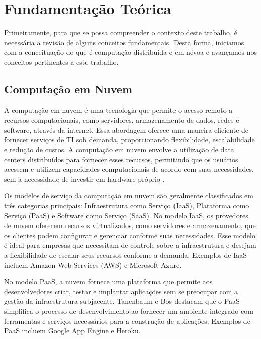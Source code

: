 \chapter{Fundamentação Teórica}

Primeiramente, para que se possa compreender o contexto deste trabalho, é necessária a revisão de alguns conceitos fundamentais. Desta forma, iniciamos com a conceituação do que é computação distribuída e em névoa e avançamos nos conceitos pertinentes a este trabalho.

\section{Computação em Nuvem}

A computação em nuvem é uma tecnologia que permite o acesso remoto a recursos computacionais, como servidores, armazenamento de dados, redes e software, através da internet. Essa abordagem oferece uma maneira eficiente de fornecer serviços de TI sob demanda, proporcionando flexibilidade, escalabilidade e redução de custos. A computação em nuvem envolve a utilização de data centers distribuídos para fornecer esses recursos, permitindo que os usuários acessem e utilizem capacidades computacionais de acordo com suas necessidades, sem a necessidade de investir em hardware próprio \cite{tanenbaum2015}.

Os modelos de serviço da computação em nuvem são geralmente classificados em três categorias principais: Infraestrutura como Serviço (IaaS), Plataforma como Serviço (PaaS) e Software como Serviço (SaaS). No modelo IaaS, os provedores de nuvem oferecem recursos virtualizados, como servidores e armazenamento, que os clientes podem configurar e gerenciar conforme suas necessidades. Esse modelo é ideal para empresas que necessitam de controle sobre a infraestrutura e desejam a flexibilidade de escalar seus recursos conforme a demanda. Exemplos de IaaS incluem Amazon Web Services (AWS) e Microsoft Azure.

No modelo PaaS, a nuvem fornece uma plataforma que permite aos desenvolvedores criar, testar e implantar aplicações sem se preocupar com a gestão da infraestrutura subjacente. Tanenbaum e Bos destacam que o PaaS simplifica o processo de desenvolvimento ao fornecer um ambiente integrado com ferramentas e serviços necessários para a construção de aplicações. Exemplos de PaaS incluem Google App Engine e Heroku.

